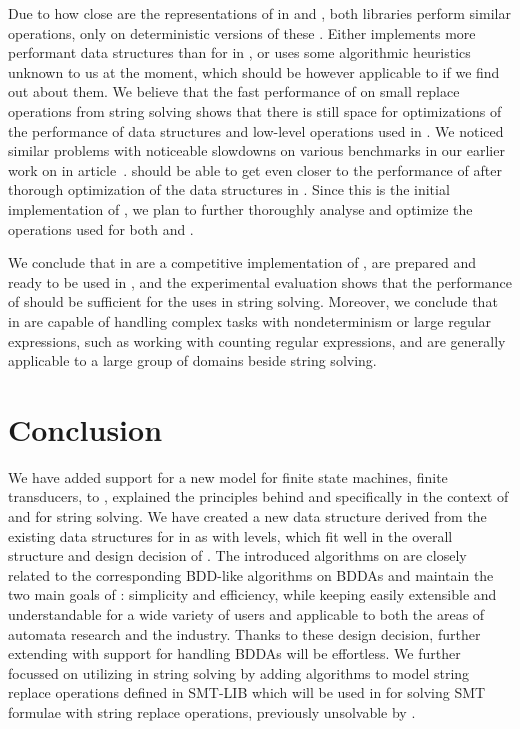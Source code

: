 Due to how close are the representations of \nfts in \mata and \mona, both libraries perform similar operations, only \mona on deterministic versions of these \nfts.
Either \mona implements more performant data structures than \deltastruct for \nfas in \mata, or \mona uses some algorithmic heuristics unknown to us at the moment, which should be however applicable to \mata if we find out about them.
We believe that the fast performance of \mona on small replace operations from string solving shows that there is still space for optimizations of the performance of data structures and low-level operations used in \mata.
We noticed similar problems with noticeable slowdowns on various \nfa benchmarks in our earlier work on \mata in article~\cite{tacas24_mata_10.1007/978-3-031-57249-4_7}.
\mata should be able to get even closer to the performance of \mona after thorough optimization of the data structures in \mata.
Since this is the initial implementation of \nfts, we plan to further thoroughly analyse and optimize the operations used for both \nfas and \nfts.

We conclude that \nfts in \mata are a competitive implementation of \nfts, are prepared and ready to be used in \noodler, and the experimental evaluation shows that the performance of \mata should be sufficient for the uses in string solving.
Moreover, we conclude that \nfts in \mata are capable of handling complex tasks with nondeterminism or large regular expressions, such as working with counting regular expressions, and are generally applicable to a large group of domains beside string solving.

\chapter{Conclusion}

We have added support for a new model for finite state machines, finite transducers, to \mata, explained the principles behind \nfts and specifically \nfts in the context of \mata and \noodler for string solving.
We have created a new data structure derived from the existing data structures for \nfas in \mata as \nfas with levels, which fit well in the overall structure and design decision of \mata.
The introduced algorithms on \nfts are closely related to the corresponding BDD-like algorithms on BDDAs and maintain the two main goals of \mata: simplicity and efficiency, while keeping \mata easily extensible and understandable for a wide variety of users and applicable to both the areas of automata research and the industry.
Thanks to these design decision, further extending \mata with support for handling BDDAs will be effortless.
We further focussed on utilizing \nfts in string solving by adding algorithms to model string replace operations defined in SMT-LIB which will be used in \noodler for solving SMT formulae with string replace operations, previously unsolvable by \noodler.

